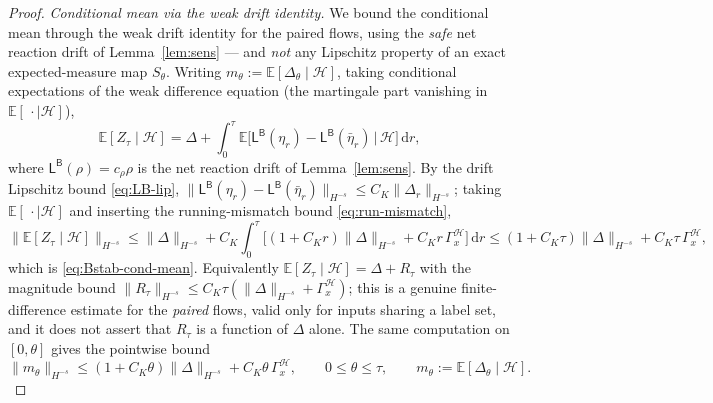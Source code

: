 \documentclass[a4paper,fleqn]{cas-sc}
\theoremstyle{definition}
\theoremstyle{remark}
\begin{document}
\begin{proof}
\emph{Conditional mean via the weak drift identity.} We bound the conditional mean
through the weak drift identity for the paired flows, using the \emph{safe} net
reaction drift of Lemma~\ref{lem:sens} --- and \emph{not} any Lipschitz property of an
exact expected-measure map $S_\theta$. Writing
$m_\theta:=\mathbb E[\Delta_\theta\mid\mathcal H]$, taking conditional expectations of
the weak difference equation (the martingale part vanishing in $\mathbb E[\,\cdot\mid\mathcal H]$),
\begin{equation}\label{eq:cond-drift}
\mathbb E[Z_\tau\mid\mathcal H]=\Delta+\int_0^\tau\mathbb E\bigl[\mathsf L^{\mathsf B}(\eta_r)-\mathsf L^{\mathsf B}(\bar\eta_r)\,\big|\,\mathcal H\bigr]\,\mathrm dr,
\end{equation}
where $\mathsf L^{\mathsf B}(\rho)=c_\rho\rho$ is the net reaction drift of
Lemma~\ref{lem:sens}. By the drift Lipschitz bound \eqref{eq:LB-lip},
$\|\mathsf L^{\mathsf B}(\eta_r)-\mathsf L^{\mathsf B}(\bar\eta_r)\|_{H^{-s}}\le C_K\|\Delta_r\|_{H^{-s}}$;
taking $\mathbb E[\,\cdot\mid\mathcal H]$ and inserting the running-mismatch bound
\eqref{eq:run-mismatch},
\[
\bigl\|\mathbb E[Z_\tau\mid\mathcal H]\bigr\|_{H^{-s}}
\le\|\Delta\|_{H^{-s}}+C_K\!\int_0^\tau\bigl[(1+C_Kr)\|\Delta\|_{H^{-s}}+C_Kr\,\Gamma_x^{\mathcal H}\bigr]\,\mathrm dr
\le(1+C_K\tau)\|\Delta\|_{H^{-s}}+C_K\tau\,\Gamma_x^{\mathcal H},
\]
which is \eqref{eq:Bstab-cond-mean}. Equivalently $\mathbb E[Z_\tau\mid\mathcal H]=\Delta+R_\tau$
with the magnitude bound
$\|R_\tau\|_{H^{-s}}\le C_K\tau(\|\Delta\|_{H^{-s}}+\Gamma_x^{\mathcal H})$; this is a
genuine finite-difference estimate for the \emph{paired} flows, valid only for inputs
sharing a label set, and it does not assert that $R_\tau$ is a function of $\Delta$
alone. The same computation on $[0,\theta]$ gives the pointwise bound
\begin{equation}\label{eq:mu-theta}
\|m_\theta\|_{H^{-s}}\le(1+C_K\theta)\|\Delta\|_{H^{-s}}+C_K\theta\,\Gamma_x^{\mathcal H},
\qquad 0\le\theta\le\tau,
\qquad m_\theta:=\mathbb E[\Delta_\theta\mid\mathcal H].
\end{equation}



\end{proof}
\end{document}
